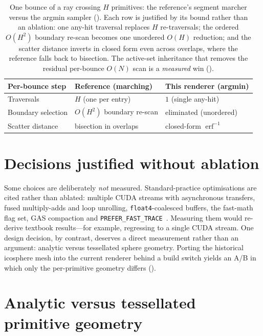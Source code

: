 \begin{table}[htp]
  \centering
  \begin{tabular}{@{}lll@{}}
    \toprule
    Per-bounce step & Reference (marching) & This renderer (argmin) \\
    \midrule
    Traversals          & $H$ (one per entry)      & $1$ (single any-hit) \\
    Boundary selection  & $O(H^2)$ boundary re-scan & eliminated (unordered) \\
    Scatter distance    & bisection in overlaps    & closed-form $\operatorname{erf}^{-1}$ \\
    \bottomrule
  \end{tabular}
  \caption{One bounce of a ray crossing $H$ primitives: the reference's segment marcher versus the
argmin sampler (). Each row is justified by its bound rather than an
ablation: one any-hit traversal replaces $H$ re-traversals; the ordered $O(H^2)$ boundary
re-scan becomes one unordered $O(H)$ reduction; and the scatter distance inverts in closed
form even across overlaps, where the reference falls back to bisection. The active-set
inheritance that removes the residual per-bounce $O(N)$ scan is a \emph{measured} win
().}
  \label{tab:complexity}
\end{table}

\section{Decisions justified without ablation}
\label{sec:reasoned}

Some choices are deliberately \emph{not} measured. Standard-practice optimisations are cited rather
than ablated: multiple CUDA
streams with asynchronous transfers, fused multiply-adds and loop unrolling, \texttt{float4}-coalesced
buffers, the fast-math flag set, GAS compaction and
\texttt{PREFER\_FAST\_TRACE}~\cite{CudaBestPractices,Optix}. Measuring them
would re-derive textbook results---for example, regressing to a single CUDA stream. One
design decision, by contrast, deserves a direct measurement rather than an argument: analytic versus
tessellated sphere geometry. Porting the historical icosphere mesh into the current renderer behind a
build switch yields an A/B in which only the per-primitive geometry differs ().

\section{Analytic versus tessellated primitive geometry}
\label{sec:icosphere}

